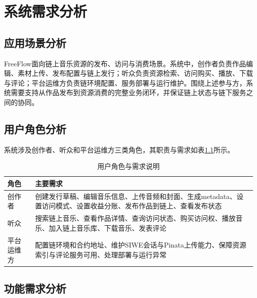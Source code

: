 
\chapter{系统需求分析}

\section{应用场景分析}

FreeFlow面向链上音乐资源的发布、访问与消费场景。系统中，创作者负责作品编辑、素材上传、发布配置与链上发行；听众负责资源检索、访问购买、播放、下载与评论；平台运维方负责链环境配置、服务部署与运行维护。围绕上述参与方，系统需要支持从作品发布到资源消费的完整业务闭环，并保证链上状态与链下服务之间的协同。

\section{用户角色分析}

系统涉及创作者、听众和平台运维方三类角色，其职责与需求如表\ref{tab:user_roles}所示。

\begin{table}[htbp]
    \linespread{1.5}
    \songti
    \centering
    \caption{用户角色与需求说明}\label{tab:user_roles}
    \begin{tabular}{|l|p{10cm}|}
        \hline
        角色    & 主要需求                                                          \\ \hline
        创作者   & 创建发行草稿、编辑音乐信息、上传音频和封面、生成metadata、设置访问模式、设置收益分账、发布作品到链上、查看发布状态 \\ \hline
        听众    & 搜索链上音乐、查看作品详情、查询访问状态、购买访问权、播放音乐、加入链上音乐库、下载音乐、发表评论             \\ \hline
        平台运维方 & 配置链环境和合约地址、维护SIWE会话与Pinata上传能力、保障资源索引与评论服务可用、处理部署与运行异常        \\ \hline
    \end{tabular}
\end{table}

\section{功能需求分析}


